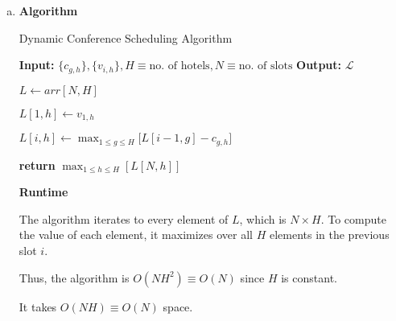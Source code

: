 \documentclass[10pt]{article}
\newcommand{\Ell}{\mathcal{L}}
\begin{document}
\begin{solution}
\begin{enumerate}[(a)]
{        }

        \item {
        
            \textbf{Algorithm}
            
            \begin{algorithm}
                \caption{Dynamic Conference Scheduling Algorithm}
                \begin{algorithmic}[1]
                    \Statex \textbf{Input: } $\{c_{g,h}\}, \{v_{i, h}\}, H \equiv \text{no. of hotels}, N \equiv \text{no. of slots}$
                    \Statex \textbf{Output: } $\Ell$

                    \State $L \gets arr[N, H]$

                        \State $L[1, h] \gets v_{1, h}$
                    \EndFor

                            \State $\displaystyle L[i, h] \gets \max_{1 \leq g \leq H} \Bigr [ L[i-1, g] - c_{g, h} \Bigr ]$
                        \EndFor
                    \EndFor

                    \State \textbf{return } $\displaystyle \max_{1 \leq h \leq H}[L[N, h]]$

                \end{algorithmic}
            \end{algorithm}

            \textbf{Runtime}

            The algorithm iterates to every element of $L$, which is $N \times H$. 
            To compute the value of each element, it maximizes over all $H$ 
            elements in the previous slot $i$. 

            Thus, the algorithm is $O(NH^2) \equiv O(N)$ since $H$ is constant. 

            It takes $O(NH) \equiv O(N)$ space. 

        }

    \end{enumerate}

\end{solution}
\newpage


\end{document}
